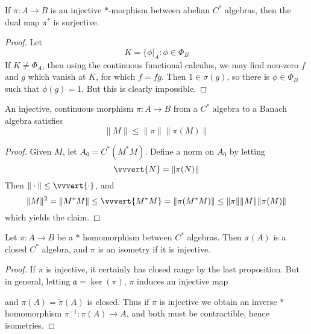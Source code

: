 \begin{lemma}
    If $\pi: A \to B$ is an injective $*$-morphism between abelian $C^*$ algebras, then the dual map $\pi^*$ is surjective.
\end{lemma}
\begin{proof}
    Let
    \[ K = \{ \phi|_A : \phi \in \Phi_B \]
    If $K \neq \Phi_A$, then using the continuous functional calculus, we may find non-zero $f$ and $g$ which vanish at $K$, for which $f = fg$. Then $1 \in \sigma(g)$, so there is $\phi \in \Phi_B$ such that $\phi(g) = 1$. But this is clearly impossible.
\end{proof}

\begin{prop}
    An injective, continuous morphism $\pi: A \to B$ from a $C^*$ algebra to a Banach algebra satisfies
    \[ \| M \| \leq \| \pi \| \| \pi(M) \| \]
\end{prop}
\begin{proof}
    Given $M$, let $A_0 = C^*(M^*M)$. Define a norm on $A_0$ by letting
    \[ \vvvert{N} = \| \pi(N) \| \]
    Then $\| \cdot \| \leq \vvvert{\cdot}$, and
    \[ \| M \|^2 = \| M^*M \| \leq \vvvert{M^*M} = \| \pi(M^*M) \| \leq \| \pi \| \| M \| \| \pi(M) \| \]
    which yields the claim.
\end{proof}

\begin{corollary}
    Let $\pi: A \to B$ be a $*$ homomorphism between $C^*$ algebras. Then $\pi(A)$ is a closed $C^*$ algebra, and $\pi$ is an isometry if it is injective.
\end{corollary}
\begin{proof}
    If $\pi$ is injective, it certainly has closed range by the last proposition. But in general, letting $\mathfrak{a} = \ker(\pi)$, $\pi$ induces an injective map
    \begin{center}
    \end{center}
    and $\pi(A) = \tilde{\pi}(A)$ is closed. Thus if $\pi$ is injective we obtain an inverse $*$ homomorphism $\pi^{-1}: \pi(A) \to A$, and both must be contractible, hence isometries.
\end{proof}

